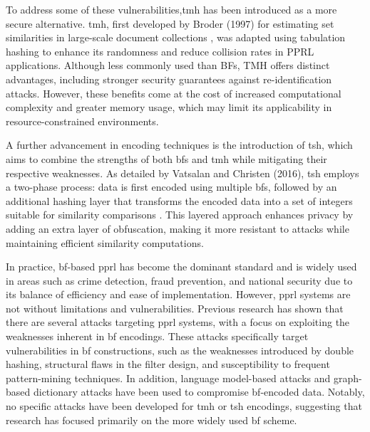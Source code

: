To address some of these vulnerabilities,\ac{tmh} has been introduced as a more secure alternative. 
\ac{tmh}, first developed by Broder (1997) for estimating set similarities in large-scale document collections \cite{broder1997resemblance}, was adapted using tabulation hashing to enhance its randomness and reduce collision rates in PPRL applications. 
Although less commonly used than BFs, TMH offers distinct advantages, including stronger security guarantees against re-identification attacks. 
However, these benefits come at the cost of increased computational complexity and greater memory usage, which may limit its applicability in resource-constrained environments.

A further advancement in encoding techniques is the introduction of \ac{tsh}, which aims to combine the strengths of both \ac{bf}s and \ac{tmh} while mitigating their respective weaknesses.
As detailed by Vatsalan and Christen (2016), \ac{tsh} employs a two-phase process: data is first encoded using multiple \ac{bf}s, followed by an additional hashing layer that transforms the encoded data into a set of integers suitable for similarity comparisons \cite{vatsalan2016privacy}. 
This layered approach enhances privacy by adding an extra layer of obfuscation, making it more resistant to attacks while maintaining efficient similarity computations.

In practice, \ac{bf}-based \ac{pprl} has become the dominant standard and is widely used in areas such as crime detection, fraud prevention, and national security due to its balance of efficiency and ease of implementation.
However, \ac{pprl} systems are not without limitations and vulnerabilities. 
Previous research has shown that there are several attacks targeting \ac{pprl} systems, with a focus on exploiting the weaknesses inherent in \ac{bf} encodings.
These attacks specifically target vulnerabilities in \ac{bf} constructions, such as the weaknesses introduced by double hashing, structural flaws in the filter design, and susceptibility to frequent pattern-mining techniques. 
In addition, language model-based attacks and graph-based dictionary attacks have been used to compromise \ac{bf}-encoded data. 
Notably, no specific attacks have been developed for \ac{tmh} or \ac{tsh} encodings, suggesting that research has focused primarily on the more widely used \ac{bf} scheme. \cite{vidanage2020graph}


